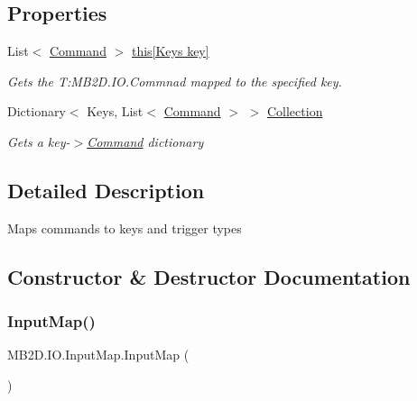 \subsection*{Properties}
\begin{DoxyCompactItemize}
\item 
List$<$ \hyperlink{class_m_b2_d_1_1_i_o_1_1_command}{Command} $>$ \hyperlink{class_m_b2_d_1_1_i_o_1_1_input_map_ad78e010b598d32be8fbd1b30c41b7ee0}{this\mbox{[}\+Keys key\mbox{]}}
\begin{DoxyCompactList}\small\item\em Gets the T\+:\+M\+B2\+D.\+I\+O.\+Commnad mapped to the specified key. \end{DoxyCompactList}\item 
Dictionary$<$ Keys, List$<$ \hyperlink{class_m_b2_d_1_1_i_o_1_1_command}{Command} $>$ $>$ \hyperlink{class_m_b2_d_1_1_i_o_1_1_input_map_a16a798fd9e5c599591620b52c5eb8a55}{Collection}
\begin{DoxyCompactList}\small\item\em Gets a key-\/$>$\hyperlink{class_m_b2_d_1_1_i_o_1_1_command}{Command} dictionary \end{DoxyCompactList}\end{DoxyCompactItemize}


\subsection{Detailed Description}
Maps commands to keys and trigger types 



\subsection{Constructor \& Destructor Documentation}
\hypertarget{class_m_b2_d_1_1_i_o_1_1_input_map_a37cd0d946d9a15c9a5ce96d5ca2ca8f1}{}\label{class_m_b2_d_1_1_i_o_1_1_input_map_a37cd0d946d9a15c9a5ce96d5ca2ca8f1} 
\subsubsection{\texorpdfstring{Input\+Map()}{InputMap()}}
{\footnotesize\ttfamily M\+B2\+D.\+I\+O.\+Input\+Map.\+Input\+Map (\begin{DoxyParamCaption}{ }\end{DoxyParamCaption})\hspace{0.3cm}{\ttfamily [inline]}}



